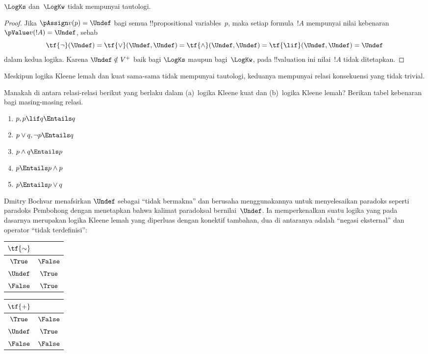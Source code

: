\documentclass[../../../include/open-logic-section]{subfiles}
\begin{document}
\begin{prop}
  $\LogKs$ dan~$\LogKw$ tidak mempunyai tautologi.
\end{prop}

\begin{proof}
  Jika $\pAssign v(p)=\Undef$ bagi semua !!{propositional variable}s~$p$,
  maka setiap formula~$!A$ mempunyai nilai kebenaran
  $\pValue v(!A)=\Undef$, sebab
  \[
    \tf{\lnot}(\Undef)=\tf{\lor}(\Undef,\Undef)=\tf{\land}(\Undef,
  \Undef)=\tf{\lif}(\Undef,\Undef)=\Undef
  \]
  dalam kedua logika. Karena $\Undef\notin V^+$ baik bagi $\LogKs$ maupun
  bagi~$\LogKw$, pada !!{valuation} ini nilai~$!A$ tidak ditetapkan.
\end{proof}

Meskipun logika Kleene lemah dan kuat sama-sama tidak mempunyai tautologi,
keduanya mempunyai relasi konsekuensi yang tidak trivial.

\begin{prob}
  Manakah di antara relasi-relasi berikut yang berlaku dalam (a)~logika
  Kleene kuat dan (b)~logika Kleene lemah? Berikan tabel kebenaran bagi
  masing-masing relasi.
  \begin{enumerate}
    \item $p,p\lif q\Entails q$
    \item $p\lor q,\lnot p\Entails q$
    \item $p\land q\Entails p$
    \item $p\Entails p\land p$
    \item $p\Entails p\lor q$
  \end{enumerate}
\end{prob}

Dmitry Bochvar menafsirkan $\Undef$ sebagai ``tidak bermakna'' dan berusaha
menggunakannya untuk menyelesaikan paradoks seperti paradoks Pembohong dengan
menetapkan bahwa kalimat paradoksal bernilai~$\Undef$. Ia memperkenalkan suatu
logika yang pada dasarnya merupakan logika Kleene lemah yang diperluas dengan
konektif tambahan, dua di antaranya adalah ``negasi eksternal'' dan operator
``tidak terdefinisi'':
\begin{center}
  \begin{tabular}{c|c}
    $\tf{\sim}$ & \\
    \hline
    $\True$ & $\False$ \\
    $\Undef$ & $\True$ \\
    $\False$ & $\True$
  \end{tabular}
\quad
  \begin{tabular}{c|c}
    $\tf{+}$ & \\
    \hline
    $\True$ & $\False$ \\
    $\Undef$ & $\True$ \\
    $\False$ & $\False$
  \end{tabular}
\end{center}
\end{document}
